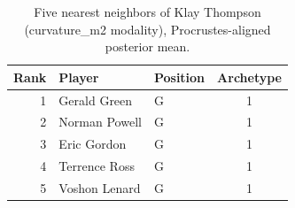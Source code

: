 \begin{table}[htbp]
  \centering\small
  \begin{tabular}{rllc}
    \toprule
    Rank & Player & Position & Archetype \\
    \midrule
    1 & Gerald Green & G & 1 \\
    2 & Norman Powell & G & 1 \\
    3 & Eric Gordon & G & 1 \\
    4 & Terrence Ross & G & 1 \\
    5 & Voshon Lenard & G & 1 \\
    \bottomrule
  \end{tabular}
  \caption{Five nearest neighbors of Klay Thompson (curvature_m2 modality), Procrustes-aligned posterior mean.}
  \label{tab:Klay_Thompson_neighbors_curvature_m2}
\end{table}

